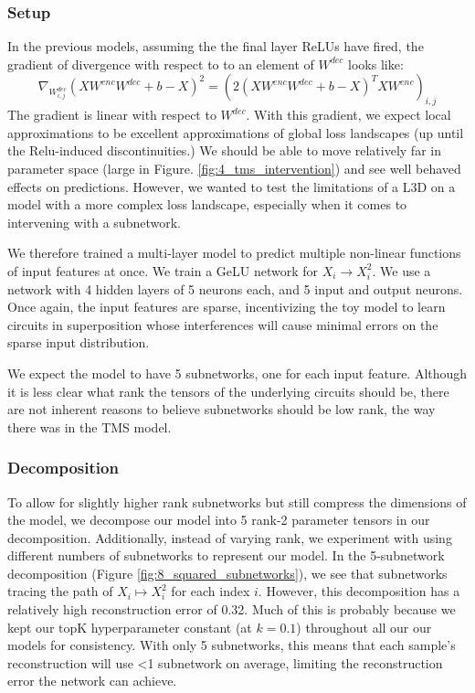 \documentclass{article}
\theoremstyle{plain}
\theoremstyle{definition}
\theoremstyle{remark}
\begin{document}
\subsubsection{Setup}

In the previous models, assuming the the final layer ReLUs have fired, the gradient of divergence with respect to  to an element of $W^{dec}$ looks like:
\begin{equation}
  \nabla_{W^{dec}_{i,j}} ( X W^{enc}W^{dec} + b - X)^2 = (2 (X W^{enc} W^{dec} + b- X)^T X W^{enc})_{i,j}
\end{equation}
The gradient is linear with respect to $W^{dec}$. With this gradient, we expect local approximations to be excellent approximations of global loss landscapes (up until the Relu-induced discontinuities.) We should be able to move relatively far in parameter space (large \delta in Figure. \ref{fig:4_tms_intervention}) and see well behaved effects on predictions. However, we wanted to test the limitations of a L3D on a model with a more complex loss landscape, especially when it comes to intervening with a subnetwork.

We therefore trained a multi-layer model to predict multiple non-linear functions of input features at once. We train a GeLU network for $X_i \rightarrow X_i^2$. We use a network with 4 hidden layers of 5 neurons each, and 5 input and output neurons. Once again, the input features are sparse, incentivizing the toy model to learn circuits in superposition whose interferences will cause minimal errors on the sparse input distribution. 

We expect the model to have 5 subnetworks, one for each input feature. Although it is less clear what rank the tensors of the underlying circuits should be, there are not inherent reasons to believe subnetworks should be low rank, the way there was in the TMS model. 

\subsubsection{Decomposition}

To allow for slightly higher rank subnetworks but still compress the dimensions of the model, we decompose our model into 5 rank-2 parameter tensors in our decomposition. Additionally, instead of varying rank, we experiment with using different numbers of subnetworks to represent our model. In the 5-subnetwork decomposition (Figure \ref{fig:8_squared_subnetworks}), we see that subnetworks tracing the path of $X_i \mapsto X_i^2$ for each index $i$. However, this decomposition has a relatively high reconstruction error of 0.32. Much of this is probably because we kept our $\text{topK}$ hyperparameter constant (at $k=0.1$) throughout all our our models for consistency.  With only 5 subnetworks, this means that each sample's reconstruction will use <1 subnetwork on average,  limiting the reconstruction error the network can achieve. 
\end{document}
